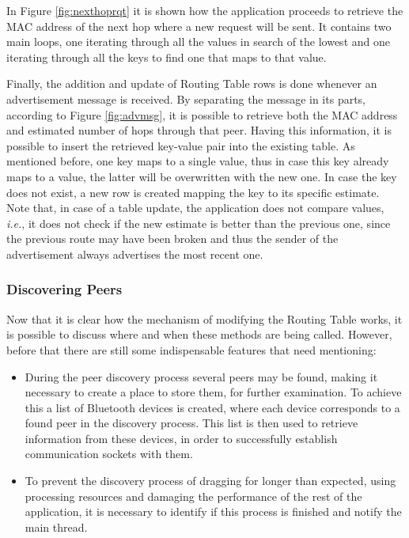In Figure \ref{fig:nexthoprqt} it is shown how the application proceeds to retrieve the \gls{MAC} address of the next hop where a new request will be sent. It contains two main loops, one iterating through all the values in search of the lowest and one iterating through all the keys to find one that maps to that value.

Finally, the addition and update of Routing Table rows is done whenever an advertisement message is received. By separating the message in its parts, according to Figure \ref{fig:advmsg}, it is possible to retrieve both the \gls{MAC} address and estimated number of hops through that peer. Having this information, it is possible to insert the retrieved key-value pair into the existing table. As mentioned before, one key maps to a single value, thus in case this key already maps to a value, the latter will be overwritten with the new one. In case the key does not exist, a new row is created mapping the key to its specific estimate. Note that, in case of a table update, the application does not compare values, \textit{i.e.}, it does not check if the new estimate is better than the previous one, since the previous route may have been broken and thus the sender of the advertisement always advertises the most recent one.

\subsubsection{Discovering Peers}
\label{subsubsec:disc}

Now that it is clear how the mechanism of modifying the Routing Table works, it is possible to discuss where and when these methods are being called. However, before that there are still some indispensable features that need mentioning:

\begin{itemize}
	\item During the peer discovery process several peers may be found, making it necessary to create a place to store them, for further examination. To achieve this a list of Bluetooth devices is created, where each device corresponds to a found peer in the discovery process. This list is then used to retrieve information from these devices, in order to successfully establish communication sockets with them.
	
	\item To prevent the discovery process of dragging for longer than expected, using processing resources and damaging the performance of the rest of the application, it is necessary to identify if this process is finished and notify the main thread.
\end{itemize}

